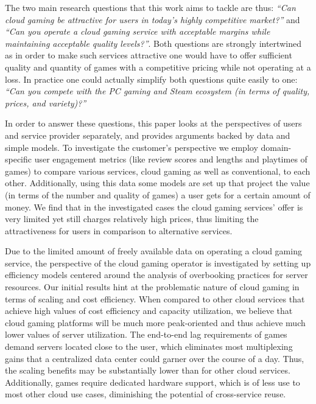 The two main research questions that this work aims to tackle are thus: \textit{``Can cloud gaming be attractive for users in today's highly competitive market?''} and \textit{``Can you operate a cloud gaming service with acceptable margins while maintaining acceptable quality levels?''}. Both questions are strongly intertwined as in order to make such services attractive one would have to offer sufficient quality and quantity of games with a competitive pricing while not operating at a loss. In practice one could actually simplify both questions quite easily to one: \textit{``Can you compete with the PC gaming and Steam ecosystem (in terms of quality, prices, and variety)?''}

In order to answer these questions, this paper looks at the perspectives of users and service provider separately, and provides arguments backed by data and simple models. To investigate the customer's perspective we employ domain-specific user engagement metrics (like review scores and lengths and playtimes of games) to compare various services, cloud gaming as well as conventional, to each other. Additionally, using this data some models are set up that project the value (in terms of the number and quality of games) a user gets for a certain amount of money. We find that in the investigated cases the cloud gaming services' offer is very limited yet still charges relatively high prices, thus limiting the attractiveness for users in comparison to alternative services.

Due to the limited amount of freely available data on operating a cloud gaming service, the perspective of the cloud gaming operator is investigated by setting up efficiency models centered around the analysis of overbooking practices for server resources. Our initial results hint at the problematic nature of cloud gaming in terms of scaling and cost efficiency. When compared to other cloud services that achieve high values of cost efficiency and capacity utilization, we believe that cloud gaming platforms will be much more peak-oriented and thus achieve much lower values of server utilization. The end-to-end lag requirements of games demand servers located close to the user, which eliminates most multiplexing gains that a centralized data center could garner over the course of a day. Thus, the scaling benefits may be substantially lower than for other cloud services. Additionally, games require dedicated hardware support, which is of less use to most other cloud use cases, diminishing the potential of cross-service reuse.

